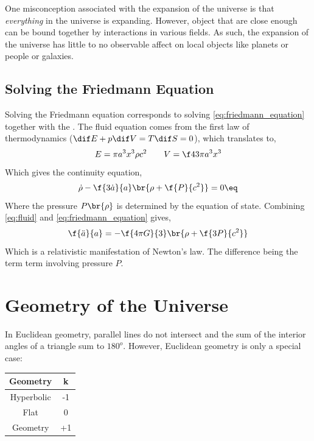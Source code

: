 \documentclass{article}
\begin{document}
One misconception associated with the expansion of the universe is that \textit{everything} in the universe is expanding. However, object that are close enough can be bound together by interactions in various fields. As such, the expansion of the universe has little to no observable affect on local objects like planets or people or galaxies. \\

\subsection{Solving the Friedmann Equation}

Solving the Friedmann equation corresponds to solving \cref{eq:friedmann_equation} together with the . The fluid equation comes from the first law of thermodynamics ($\dif E + p \dif V = T \dif S = 0$), which translates to,
\[ E = \pi a^3 x^3 \rho c^2 \qquad V = \f43 \pi a^3 x^3 \]
Which gives the continuity equation,
\[ \dot{\rho} - \f{3\dot{a}}{a} \br{\rho + \f{P}{c^2}} = 0 \eq \label{eq:fluid}\]
Where the pressure $P\br{\rho}$ is determined by the equation of state. Combining \cref{eq:fluid} and \cref{eq:friedmann_equation} gives,
\[ \f{\ddot{a}}{a} = - \f{4 \pi G}{3} \br{\rho + \f{3P}{c^2}} \]
Which is a relativistic manifestation of Newton's law. The difference being the term term involving pressure $P$.

\section{Geometry of the Universe}

In Euclidean geometry, parallel lines do not intersect and the sum of the interior angles of a triangle sum to $180^o$. However, Euclidean geometry is only a special case:

\begin{center}
\begin{tabular}{|c|c|}
    \hline
    Geometry & k \\
    \hline
    Hyperbolic & -1 \\
    Flat & 0 \\
    Geometry & +1 \\
    \hline
\end{tabular}
\end{center}
\end{document}
